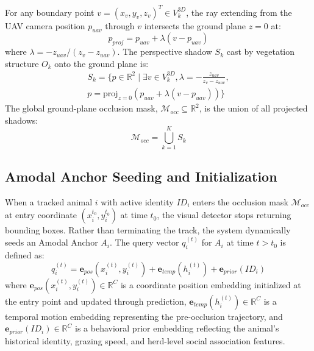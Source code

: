 \documentclass[10pt,conference,letterpaper,twocolumn]{article}
\begin{document}
For any boundary point $v = (x_v, y_v, z_v)^T \in V_k^{3D}$, the ray extending from the UAV camera position $p_{uav}$ through $v$ intersects the ground plane $z = 0$ at:
\begin{equation}
p_{proj} = p_{uav} + \lambda (v - p_{uav})
\end{equation}
where $\lambda = -z_{uav} / (z_v - z_{uav})$. The perspective shadow $S_k$ cast by vegetation structure $O_k$ onto the ground plane is:
\begin{align}
S_k = \Big\{ p \in \mathbb{R}^2 \mid \exists v \in V_k^{3D}, \lambda = -\frac{z_{uav}}{z_v - z_{uav}}, \nonumber \\
p = \text{proj}_{z=0}(p_{uav} + \lambda (v - p_{uav})) \Big\}
\end{align}
The global ground-plane occlusion mask, $\mathcal{M}_{occ} \subseteq \mathbb{R}^2$, is the union of all projected shadows:
\begin{equation}
\mathcal{M}_{occ} = \bigcup_{k=1}^{K} S_k
\end{equation}

\subsection{Amodal Anchor Seeding and Initialization}
When a tracked animal $i$ with active identity $ID_i$ enters the occlusion mask $\mathcal{M}_{occ}$ at entry coordinate $(x_i^{t_0}, y_i^{t_0})$ at time $t_0$, the visual detector stops returning bounding boxes. Rather than terminating the track, the system dynamically seeds an Amodal Anchor $A_i$. The query vector $q_i^{(t)}$ for $A_i$ at time $t > t_0$ is defined as:
\begin{equation}
q_i^{(t)} = \mathbf{e}_{pos}(x_i^{(t)}, y_i^{(t)}) + \mathbf{e}_{temp}(h_i^{(t)}) + \mathbf{e}_{prior}(ID_i)
\end{equation}
where $\mathbf{e}_{pos}(x_i^{(t)}, y_i^{(t)}) \in \mathbb{R}^C$ is a coordinate position embedding initialized at the entry point and updated through prediction, $\mathbf{e}_{temp}(h_i^{(t)}) \in \mathbb{R}^C$ is a temporal motion embedding representing the pre-occlusion trajectory, and $\mathbf{e}_{prior}(ID_i) \in \mathbb{R}^C$ is a behavioral prior embedding reflecting the animal's historical identity, grazing speed, and herd-level social association features.
\end{document}
